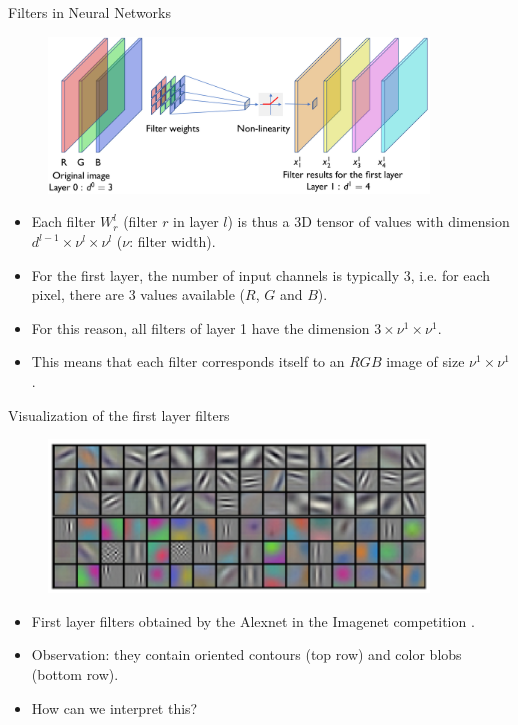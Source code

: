 \documentclass[xcolor=pdftex,dvipsnames,table]{beamer}
\begin{document}
\begin{frame}{Filters in Neural Networks}
\begin{figure}[htb]
\includegraphics[width=0.9\textwidth]{../graphics/CNN_FirstLayer.png}
\end{figure}
\begin{itemize}
	\item Each filter $W^l_r$ (filter $r$ in layer $l$) is thus a 3D tensor of values with dimension $d^{l-1}\times \nu^l\times \nu^l$ ($\nu$: filter width).
	\item For the first layer, the number of input channels is typically 3, i.e. for each pixel, there are 3 values available ($R$, $G$ and $B$).  
	\item For this reason, all filters of layer 1 have the dimension $3\times \nu^{1}\times \nu^{1}$. 
	\item This means that each filter corresponds itself to an $RGB$ image of size $\nu^{1}\times \nu^{1}$. 
\end{itemize}
\end{frame}

\begin{frame}{Visualization of the first layer filters}
\begin{figure}[htb]
\includegraphics[width=0.9\textwidth]{../graphics/Vis_filter_imagenet.png}
\end{figure}
\begin{itemize}
	\item First layer filters obtained by the Alexnet in the Imagenet competition \cite{Krizhevsky:2012}. 
	\item Observation: they contain oriented contours (top row) and color blobs (bottom row). 
	\item How can we interpret this? 
\end{itemize}
\end{frame}
\end{document}
